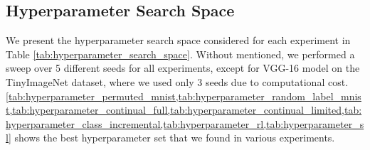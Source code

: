 \subsection{Hyperparameter Search Space}
\label{app:hyperparameter_seach_space}
We present the hyperparameter search space considered for each experiment in Table \ref{tab:hyperparameter_search_space}.
Without mentioned, we performed a sweep over 5 different seeds for all experiments, except for VGG-16 model on the TinyImageNet dataset, where we used only 3 seeds due to computational cost.
\cref{tab:hyperparameter_permuted_mnist,tab:hyperparameter_random_label_mnist,tab:hyperparameter_continual_full,tab:hyperparameter_continual_limited,tab:hyperparameter_class_incremental,tab:hyperparameter_rl,tab:hyperparameter_sl} shows the best hyperparameter set that we found in various experiments. 







\newpage


